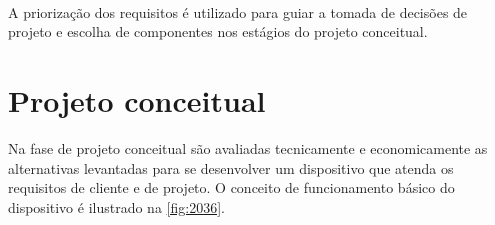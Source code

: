 \begin{table}[!ht]
    \caption{Prioridade dos requisitos definidos pela matriz QFD}
    \label{tab:resultqfd}
    \centering
\
\end{table}

A priorização dos requisitos é utilizado para guiar a tomada de decisões de projeto e escolha de componentes nos estágios do projeto conceitual.

\section{Projeto conceitual}


Na fase de projeto conceitual são avaliadas tecnicamente e economicamente as alternativas levantadas para se desenvolver um dispositivo que atenda os requisitos de cliente e de projeto.
O conceito de funcionamento básico do dispositivo é ilustrado na \autoref{fig:2036}.

